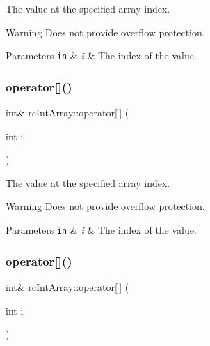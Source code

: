 The value at the specified array index. \begin{DoxyWarning}{Warning}
Does not provide overflow protection. 
\end{DoxyWarning}

\begin{DoxyParams}[1]{Parameters}
\mbox{\tt in}  & {\em i} & The index of the value. \\
\hline
\end{DoxyParams}
\mbox{\label{classrcIntArray_a795c1a259ad8ddb6e2f5143fa721a89d}} 
\subsubsection{\texorpdfstring{operator[]()}{operator[]()}\hspace{0.1cm}{\footnotesize\ttfamily [3/4]}}
{\footnotesize\ttfamily int\& rc\+Int\+Array\+::operator\mbox{[}$\,$\mbox{]} (\begin{DoxyParamCaption}\item[{int}]{i }\end{DoxyParamCaption})\hspace{0.3cm}{\ttfamily [inline]}}

The value at the specified array index. \begin{DoxyWarning}{Warning}
Does not provide overflow protection. 
\end{DoxyWarning}

\begin{DoxyParams}[1]{Parameters}
\mbox{\tt in}  & {\em i} & The index of the value. \\
\hline
\end{DoxyParams}
\mbox{\label{classrcIntArray_a795c1a259ad8ddb6e2f5143fa721a89d}} 
\subsubsection{\texorpdfstring{operator[]()}{operator[]()}\hspace{0.1cm}{\footnotesize\ttfamily [4/4]}}
{\footnotesize\ttfamily int\& rc\+Int\+Array\+::operator\mbox{[}$\,$\mbox{]} (\begin{DoxyParamCaption}\item[{int}]{i }\end{DoxyParamCaption})\hspace{0.3cm}{\ttfamily [inline]}}

